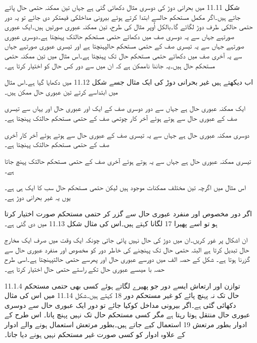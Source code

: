 
شکل 11.11 میں بحرانی دوڑ کی دوسری مثال دکھائی گئی ہے جہاں تین ممکنہ حتمی حال پائے جاتے ہیں۔اگر مکمل مستحکم حالسے ابتدا کرتے ہوئے بیرونی مداخلکی قیمتکر دی جائے تو یہ دور حتمی حالکی طرف دوڑ لگائے گا۔بالکل اُوپر مثال کی طرح، تین ممکنہ عبوری صورتیں ہیں۔ایک عبوری صورتہے جہاں سے یہ دوسری صف میں دکھائے حتمی مستحکم حالتک پہنچتا ہے۔دوسری عبوری صورتہے جہاں سے یہ تیسری صف کے حتمی مستحکم حالپہنچتا ہے اور تیسری عبوری صورتہے جہاں سے یہ آخری صف میں دکھائے حتمی مستحکم حال تک پہنچتا ہے۔اس مثال میں تین ممکنہ حتمی مستحکم حال ہیں۔یہ جاننا ناممکن ہے  کہ ان میں سے دور کس حال کو اختیار کرتا ہے۔


اب دیکھتے ہیں غیر بحرانی دوڑ کی ایک مثال جسے شکل 11.12 میں دکھایا گیا ہے۔اس مثال میں ابتداسے کرتے تین عبوری حال  ممکن ہیں۔


ایک ممکنہ عبوری حال  ہے جہاں سے دور دوسری صف کے ایک اور عبوری حال اور یہاں سے تیسری صف کے عبوری حال سے ہوتے ہوئے آخر کار  چوتھی صف کے حتمی مستحکم حالتک پہنچتا ہے۔

دوسری ممکنہ عبوری حال ہے جہاں سے یہ تیسری صف کے عبوری حال سے ہوتے ہوئے آخر کار آخری صف کے حتمی مستحکم حالتک پہنچتا ہے۔

تیسری ممکنہ عبوری حال ہے جہاں سے یہ ہوتے ہوئے آخری صف کے حتمی مستحکم حالتک پہنچ جاتا ہے۔

اس مثال میں اگرچہ تین مختلف ممکنات موجود ہیں لیکن حتمی مستحکم حال سب کا ایک ہی ہے۔یوں یہ غیر بحرانی دوڑ ہے۔  

اگر دور مخصوص اور منفرد عبوری حال   سے گزر کر حتمی مستحکم صورت اختیار کرتا ہو تو اسے پھیرا 17 لگانا کہتے ہیں۔اس کی مثال شکل 11.13 میں دی گئی ہے۔ 


	ان اشکال پر غور کریں۔ان میں دوڑ کی حال نہیں پائی جاتی چونکہ ایک وقت میں صرف ایک مخارج حال تبدیل کرتا ہے البتہ حتمی حال تک پہنچنے کی خاطر دور کو مخصوص اور منفرد عبوری حال   سے گزرنا ہوتا ہے۔
	شکل کے حصہ الف میں دورسے عبوری حال  اور پھرسے حتمی حالتپہنچتا ہے۔اسی طرح حصہ با میںسے   عبوری حال تکے راستے حتمی حال اختیار کرتا ہے۔

11.1.4 توازن اور ارتعاش 
	 ایسے دور جو پھیرے لگاتے ہوئے کسی بھی حتمی مستحکم حال تک نہ پہنچ پائے کو غیر مستحکم دور 18 کہتے ہیں۔شکل 11.14 میں اس کی مثال دکھائی گئی ہے۔اگر بیرونی مداخل کوکیا جائے تو دور ایک عبوری حال  سے دوسری عبوری حال  منتقل ہوتا رہتا ہے مگر کسی مستحکم حال تک نہیں پہنچ پاتا۔
	اس طرح کے ادوار بطور مرتعش 19 استعمال کیے جاتے ہیں۔بطور مرتعش استعمال ہونے والے ادوار کے علاوہ ادوار کو کسی صورت غیر مستحکم نہیں ہونے دیا جاتا۔

